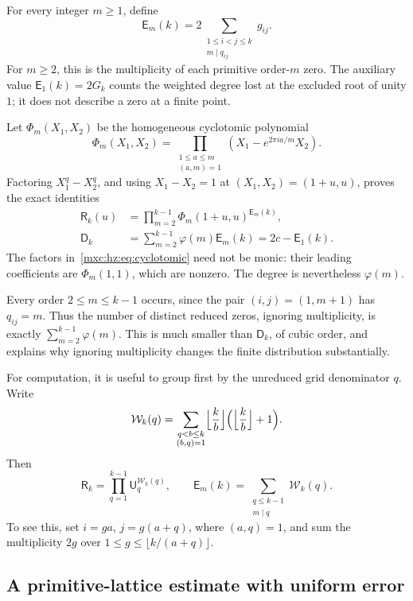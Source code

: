 \documentclass[11pt]{article}
\numberwithin{equation}{section}
\theoremstyle{definition}
\theoremstyle{remark}
\begin{document}
For every integer $m\ge1$, define
\begin{equation}\label{mxc:hz:eq:E-exact}
 \mathsf E_m(k)=2\sum_{\substack{1\le i<j\le k\\m\mid q_{ij}}}g_{ij}.
\end{equation}
For $m\ge2$, this is the multiplicity of each primitive order-$m$ zero.
The auxiliary value $\mathsf E_1(k)=2G_k$ counts the weighted degree lost
at the excluded root of unity $1$; it does not describe a zero at a finite
point.

Let $\Phi_m(X_1,X_2)$ be the homogeneous cyclotomic polynomial
\[
 \Phi_m(X_1,X_2)=
 \prod_{\substack{1\le a\le m\\(a,m)=1}}
       (X_1-e^{2\pi ia/m}X_2).
\]
Factoring $X_1^q-X_2^q$, and using $X_1-X_2=1$ at $(X_1,X_2)=(1+u,u)$,
proves the exact identities
\begin{align}
 \mathsf R_k(u)&=\prod_{m=2}^{k-1}
          \Phi_m(1+u,u)^{\mathsf E_m(k)},\label{mxc:hz:eq:cyclotomic}\\
 \mathsf D_k&=\sum_{m=2}^{k-1}\varphi(m)\mathsf E_m(k)
     =2c-\mathsf E_1(k).\label{mxc:hz:eq:degree-cyclotomic}
\end{align}
The factors in~\eqref{mxc:hz:eq:cyclotomic} need not be monic: their
leading coefficients are $\Phi_m(1,1)$, which are nonzero. The degree is
nevertheless $\varphi(m)$.

Every order $2\le m\le k-1$ occurs, since the pair $(i,j)=(1,m+1)$ has
$q_{ij}=m$. Thus the number of distinct reduced zeros, ignoring
multiplicity, is exactly $\sum_{m=2}^{k-1}\varphi(m)$. This is much smaller
than $\mathsf D_k$, of cubic order, and explains why ignoring multiplicity
changes the finite distribution substantially.

For computation, it is useful to group first by the unreduced grid
denominator $q$. Write
\begin{equation}\label{mxc:hz:eq:W-exact}
 \mathcal W_k(q)=
 \sum_{\substack{q<b\le k\\(b,q)=1}}
       \Bigl\lfloor\frac{k}{b}\Bigr\rfloor
       \Bigl(\Bigl\lfloor\frac{k}{b}\Bigr\rfloor+1\Bigr).
\end{equation}
Then
\[
 \mathsf R_k=\prod_{q=1}^{k-1}\mathsf U_q^{\mathcal W_k(q)},\qquad
 \mathsf E_m(k)=\sum_{\substack{q\le k-1\\m\mid q}}\mathcal W_k(q).
\]
To see this, set $i=ga$, $j=g(a+q)$, where $(a,q)=1$, and sum the
multiplicity $2g$ over $1\le g\le\lfloor k/(a+q)\rfloor$.

\subsection{A primitive-lattice estimate with uniform error}
\end{document}
